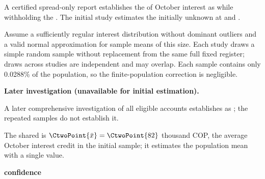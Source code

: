 \begin{probleminfoexcerpt}
A certified spread-only report establishes the    of October interest as    while withholding the  . The initial study estimates the initially unknown   at  and  .
\end{probleminfoexcerpt}

\begin{probleminfoexcerpt}
Assume a sufficiently regular interest distribution without dominant outliers and a valid normal approximation for sample means of this size. Each study draws a simple random sample without replacement from the same full fixed register; draws across studies are independent and may overlap. Each sample contains only 0.0288\% of the population, so the finite-population correction is negligible.
\end{probleminfoexcerpt}

\textbf{Later investigation (unavailable for initial estimation).}

\begin{probleminfoexcerpt}
A later comprehensive investigation of all eligible accounts establishes    as   ; the repeated samples do not establish it.
\end{probleminfoexcerpt}

The shared  is $\CtwoPoint{\bar x}=\CtwoPoint{82}$ thousand COP, the average October interest credit in the initial sample; it estimates the population mean with a single value.

\textbf{ confidence}

